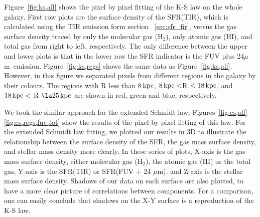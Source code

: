 \documentclass[useAMS,usenatbib]{mn2e}
\newcommand \kpc        {\,{\rm kpc}}
\newcommand \um    {$\mu$m\ }
\begin{document}
Figure~\ref{fig:ks,all} shows the pixel by pixel fitting of the K-S law on the whole galaxy. First row plots are the surface density of the SFR(TIR), which is calculated using  the TIR emission form section ~\ref{sec:sfr_fir}, versus the gas surface density traced by only the molecular gas (H$_2$),  only atomic gas (HI), and total gas from right to left, respectively. The only difference between the upper and lower plots is that in the lower row the SFR indicator is the FUV plus 24\um emission. Figure~\ref{fig:ks,regs} shows the same data as Figure~\ref{fig:ks,all}. However, in this figure we separated pixels from different regions in the galaxy by their colours. The regions with R less than 8$\kpc$, $8\kpc < $R $< 18\kpc$, and $18\kpc <$ R $\la 25\kpc$ are shown in red, green and blue, respectively. 

We took the similar approach for the extended Schmidt law. Figures~\ref{fig:es,all}--\ref{fig:es,regs,fuv,tot} show the results of the pixel by pixel fitting of this law. For the extended Schmidt law fitting, we plotted our results in 3D to illustrate the relationship between the surface density of the SFR, the gas mass surface density, and stellar mass density more clearly. In these series of plots, X-axis is the gas mass  surface density, either molecular gas (H$_2$), the atomic gas (HI) or the total gas, Y-axis is the SFR(TIR) or SFR(FUV + 24 $\mu$m), and Z-axis is the stellar mass surface density. Shadows of our data on each surface are also plotted, to have a more clear picture of correlations between components. For a comparison, one can easily conclude that shadows on the X-Y surface is a reproduction of the K-S law. 
\end{document}
